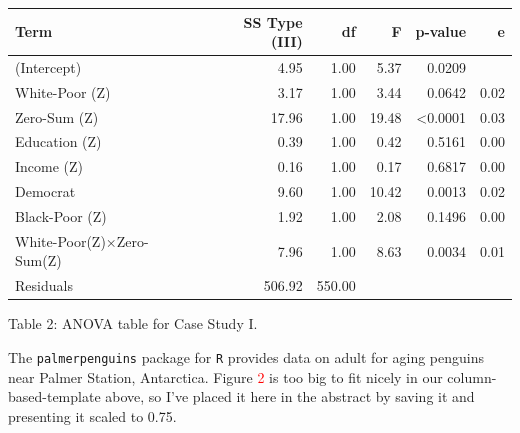 \documentclass{article}\usepackage[]{graphicx}\usepackage[]{xcolor}
\begin{document}
\begin{table}[H]
\begin{center}
\begin{tabular}{ l  r  r  r  r  r }\hline
Term & SS Type (III) & df & F & p-value & e \\\hline
(Intercept) & 4.95 & 1.00 & 5.37 & 0.0209 & \\
White-Poor (Z) & 3.17 & 1.00 & 3.44 & 0.0642 & 0.02 \\
Zero-Sum (Z) & 17.96 & 1.00 & 19.48 & <0.0001 & 0.03 \\
Education (Z) & 0.39 & 1.00 & 0.42 & 0.5161 & 0.00 \\
Income (Z) & 0.16 & 1.00 & 0.17 & 0.6817 & 0.00 \\
Democrat & 9.60 & 1.00 & 10.42 & 0.0013 & 0.02 \\
Black-Poor (Z) & 1.92 & 1.00 & 2.08 & 0.1496 & 0.00 \\
White-Poor(Z)×Zero-Sum(Z) & 7.96 & 1.00 & 8.63 & 0.0034 & 0.01 \\
Residuals & 506.92 & 550.00 & & & \\\hline
\end{tabular}
\end{center}
\end{table}
\begin{center}
Table 2: ANOVA table for Case Study I.
\end{center}

The \texttt{palmerpenguins} package for \texttt{R} \citep{palmerpenguins} provides data on adult for aging penguins near Palmer Station, Antarctica. Figure \textcolor{red}{2} is too big to fit nicely in our column-based-template above, so I’ve placed it here in the abstract by saving it and presenting it scaled to 0.75.
\end{document}
